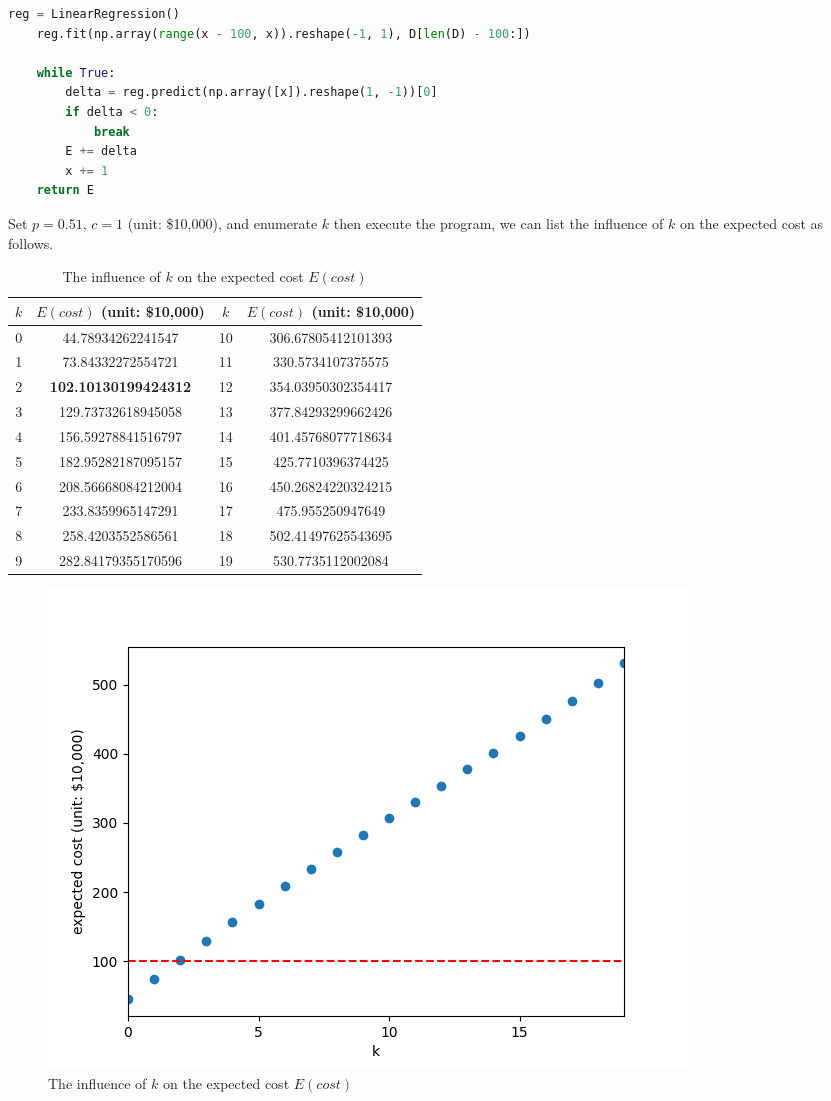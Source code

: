 \documentclass{oxmathproblems}
\makeatletter
\theoremstyle{definition}
\renewenvironment{solution}[1][Solution] {\par\pushQED{\qed}\normalfont\topsep6\p@\@plus6\p@\relax\trivlist\item[\hskip\labelsep\bfseries#1\@addpunct{.}]\ignorespaces}{\popQED\endtrivlist\@endpefalse} \makeatother
\makeatother
\begin{document}
\begin{solution}
\begin{lstlisting}[language=python]
    reg = LinearRegression()
    reg.fit(np.array(range(x - 100, x)).reshape(-1, 1), D[len(D) - 100:])

    while True:
        delta = reg.predict(np.array([x]).reshape(1, -1))[0]
        if delta < 0:
            break
        E += delta
        x += 1
    return E 
\end{lstlisting}
	Set $p = 0.51$, $c = 1$ (unit: \$10,000), and enumerate $k$ then execute the program, we can list the influence of $k$ on the expected cost as follows.
	\begin{table}[htbp]
		\centering
		\caption{The influence of $k$ on the expected cost $E(cost)$}
		\label{tab1}
		\begin{tabular}{|c|c|c|c|}  
			\hline  %
			$k$ & $E(cost)$ (unit: \$10,000) & $k$ & $E(cost)$ (unit: \$10,000)\\ \hline
			0 & 44.78934262241547 &10 & 306.67805412101393 \\
			1 & 73.84332272554721 &11 & 330.5734107375575 \\
			2 & \textbf{102.10130199424312} &12 & 354.03950302354417 \\
			3 & 129.73732618945058 & 13 & 377.84293299662426 \\
			4 & 156.59278841516797 & 14 & 401.45768077718634 \\
			5 & 182.95282187095157 & 15 & 425.7710396374425 \\
			6 & 208.56668084212004 & 16 & 450.26824220324215 \\
			7 & 233.8359965147291 &17 & 475.955250947649 \\
			8 & 258.4203552586561 & 18 & 502.41497625543695\\
			9 & 282.84179355170596 &19 & 530.7735112002084 \\ \hline	
		\end{tabular}
	\end{table}
	\begin{figure}[htbp]
		\centering
		\includegraphics[width=0.7\linewidth]{2.png}
		\caption{The influence of $k$ on the expected cost $E(cost)$}
		\label{fig2}
	\end{figure}


\end{solution}
\end{document}
